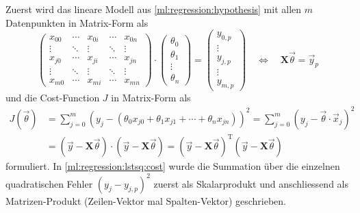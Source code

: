 Zuerst wird das lineare Modell aus \eqref{ml:regression:hypothesis} mit allen
$m$ Datenpunkten in Matrix-Form als
\begin{equation}
    \begin{pmatrix}
        x_{00}& \cdots& x_{0i}& \cdots& x_{0n}\\
        \vdots& \ddots& \vdots& \ddots& \vdots\\
        x_{j0}& \cdots& x_{ji}& \cdots& x_{jn}\\
        \vdots& \ddots& \vdots& \ddots& \vdots\\
        x_{m0}& \cdots& x_{mi}& \cdots& x_{mn}
    \end{pmatrix}
    \cdot
    \begin{pmatrix}
        \theta_0\\ \theta_1 \\ \vdots\\ \theta_n
    \end{pmatrix}
    = \begin{pmatrix}
        y_{0,p}\\ \vdots \\ y_{j,p} \\ \vdots \\ y_{m,p}
    \end{pmatrix}
    \quad \iff \quad
    \mathbf{X} \vec \theta = \vec y_p
    \label{ml:regression:lstsq:modell}
\end{equation}
und die Cost-Function $J$ in Matrix-Form als
\begin{align}
    J(\vec \theta) &= \sum_{j=0}^m \left(y_j - (\theta_0 x_{j0} + \theta_1 x_{j1} + \cdots + \theta_n x_{jn}) \right)^2
    = \sum_{j=0}^{m} \left( y_j - \vec \theta \cdot \vec x_j \right)^2 \nonumber\\
    &= \left(\vec y - \mathbf{X} \vec \theta\right) \cdot \left(\vec y - \mathbf{X} \vec \theta\right)
    = \left(\vec y - \mathbf{X} \vec \theta\right)^\mathrm{T} \left(\vec y - \mathbf{X} \vec \theta\right)
    \label{ml:regression:lstsq:cost}
\end{align}
formuliert. In \eqref{ml:regression:lstsq:cost} wurde die Summation über die
einzelnen quadratischen Fehler $(y_j - y_{j,p})^2$ zuerst als Skalarprodukt und
anschliessend als Matrizen-Produkt (Zeilen-Vektor mal Spalten-Vektor) geschrieben.


